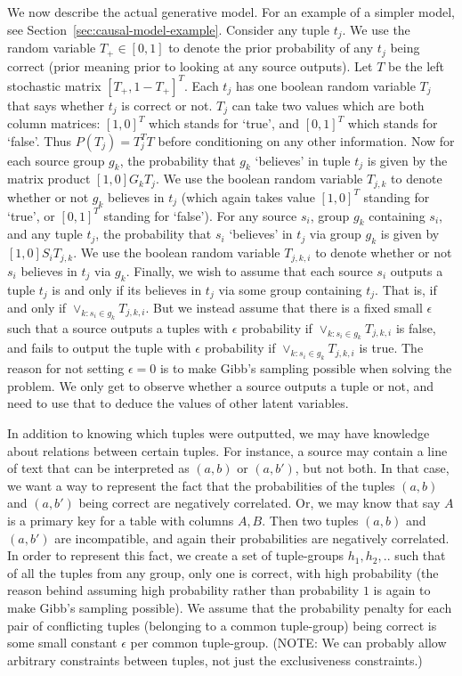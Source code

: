 \documentclass{sig-alternate}
\newcounter{prob}
\begin{document}
We now describe the actual generative model. For an example of a simpler model, see Section~\ref{sec:causal-model-example}. Consider any tuple $t_j$. We use the random variable $T_{+} \in [0,1]$ to denote the prior probability of any $t_j$ being correct (prior meaning prior to looking at any source outputs). Let $T$ be the left stochastic matrix $[T_{+},1-T_{+}]^T$. Each $t_j$ has one boolean random variable $T_j$ that says whether $t_j$ is correct or not. $T_j$ can take two values which are both column matrices: $[1,0]^T$ which stands for `true', and $[0,1]^T$ which stands for `false'. Thus $P(T_j) = T_{j}^{T}T$ before conditioning on any other information. Now for each source group $g_k$, the probability that $g_k$ `believes' in tuple $t_j$ is given by the matrix product $[1,0]G_kT_j$. We use the boolean random variable $T_{j,k}$ to denote whether or not $g_k$ believes in $t_j$ (which again takes value $[1,0]^T$ standing for `true', or $[0,1]^T$ standing for `false'). For any source $s_i$, group $g_k$ containing $s_i$, and any tuple $t_j$, the probability that $s_i$ `believes' in $t_j$ via group $g_k$ is given by $[1,0]S_iT_{j,k}$. We use the boolean random variable $T_{j,k,i}$ to denote whether or not $s_i$ believes in $t_j$ via $g_k$. Finally, we wish to assume that each source $s_i$ outputs a tuple $t_j$ is and only if its believes in $t_j$ via some group containing $t_j$. That is, if and only if $\lor_{k : s_i \in g_k} T_{j,k,i}$. But we instead assume that there is a fixed small $\epsilon$ such that a source outputs a tuples with $\epsilon$ probability if $\lor_{k : s_i \in g_k} T_{j,k,i}$ is false, and fails to output the tuple with $\epsilon$ probability if $\lor_{k : s_i \in g_k} T_{j,k,i}$ is true. The reason for not setting $\epsilon = 0$ is to make Gibb's sampling possible when solving the problem. We only get to observe whether a source outputs a tuple or not, and need to use that to deduce the values of other latent variables. 

In addition to knowing which tuples were outputted, we may have knowledge about relations between certain tuples. For instance, a source may contain a line of text that can be interpreted as $(a,b)$ or $(a, b')$, but not both. In that case, we want a way to represent the fact that the probabilities of the tuples $(a, b)$ and $(a, b')$ being correct are negatively correlated. Or, we may know that say $A$ is a primary key for a table with columns $A,B$. Then two tuples $(a,b)$ and $(a,b')$ are incompatible, and again their probabilities are negatively correlated. In order to represent this fact, we create a set of tuple-groups $h_1, h_2, ..$ such that of all the tuples from any group, only one is correct, with high probability (the reason behind assuming high probability rather than probability $1$ is again to make Gibb's sampling possible). We assume that the probability penalty for each pair of conflicting tuples (belonging to a common tuple-group) being correct is some small constant $\epsilon$ per common tuple-group. (NOTE: We can probably allow arbitrary constraints between tuples, not just the exclusiveness constraints.)
\end{document}
